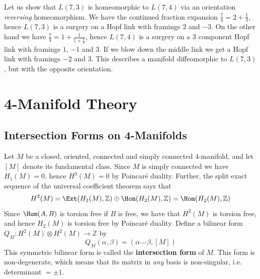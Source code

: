 \begin{example}
Let us show that $L(7,3)$ is homeomorphic to $L(7,4)$ via an orientation \emph{reversing} homeomorphism. We have the continued fraction expansion $\frac{7}{4} = 2 + \frac{1}{3}$, hence $L(7,3)$ is a surgery on a Hopf link with framings $2$ and $-3$. On the other hand we have $\frac{7}{4} = 1 + \frac{1}{1 + \frac{1}{3}}$, hence $L(7,4)$ is a surgery on a 3 component Hopf link with framings $1$, $-1$ and $3$. If we blow down the middle link we get a Hopf link with framings $-2$ and $3$. This describes a manifold diffeomorphic to $L(7,3)$, but with the opposite orientation.
\end{example}









\newpage
\section{4-Manifold Theory}
\label{4-Manifold Theory}




\subsection{Intersection Forms on 4-Manifolds}
\label{Intersection Forms on 4-Manifolds}


Let $M$ be a closed, oriented, connected and simply connected 4-manifold, and let $[M]$ denote its fundamental class. Since $M$ is simply connected we have $H_1(M) = 0$, hence $H^3(M) = 0$ by Poincar\'{e} duality. Further, the split exact sequence of the universal coefficient theorem says that
\[ H^2(M) = \Ext(H_1(M),\mathbb Z) \oplus \Hom(H_2(M),\mathbb Z) = \Hom(H_2(M),\mathbb Z) \]
Since $\Hom(A,B)$ is torsion free if $B$ is free, we have that $H^2(M)$ is torsion free, and hence $H_2(M)$ is torsion free by Poincar\'{e} duality. Define a bilinear form $Q_M : H^2(M) \otimes H^2(M) \rightarrow \mathbb Z$ by
\[ Q_M(\alpha,\beta) = (\alpha \smallsmile \beta, [M]) \]
This symmetric bilinear form is called the \textbf{intersection form} of $M$. This form is non-degenerate, which means that its matrix in \emph{any} basis is non-singular, i.e. determinant $= \pm 1$. 

